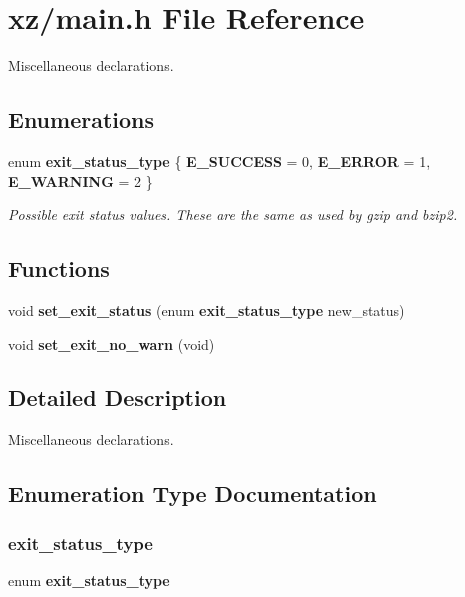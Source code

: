 \section{xz/main.h File Reference}
\label{main_8h}


Miscellaneous declarations.  


\subsection*{Enumerations}
\begin{DoxyCompactItemize}
\item 
enum \textbf{ exit\+\_\+status\+\_\+type} \{ {\bfseries E\+\_\+\+S\+U\+C\+C\+E\+SS} = 0, 
{\bfseries E\+\_\+\+E\+R\+R\+OR} = 1, 
{\bfseries E\+\_\+\+W\+A\+R\+N\+I\+NG} = 2
 \}\begin{DoxyCompactList}\small\item\em Possible exit status values. These are the same as used by gzip and bzip2. \end{DoxyCompactList}
\end{DoxyCompactItemize}
\subsection*{Functions}
\begin{DoxyCompactItemize}
\item 
void \textbf{ set\+\_\+exit\+\_\+status} (enum \textbf{ exit\+\_\+status\+\_\+type} new\+\_\+status)
\item 
void \textbf{ set\+\_\+exit\+\_\+no\+\_\+warn} (void)
\end{DoxyCompactItemize}


\subsection{Detailed Description}
Miscellaneous declarations. 



\subsection{Enumeration Type Documentation}
\mbox{\label{main_8h_af872d4d5c51b96938b58f0c59b6c3c37}} 
\subsubsection{exit\+\_\+status\+\_\+type}
{\footnotesize\ttfamily enum \textbf{ exit\+\_\+status\+\_\+type}}



